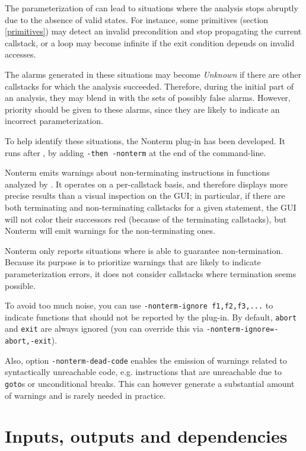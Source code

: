 \documentclass{frama-c-book}
\begin{document}
The parameterization of \Eva{} can lead to situations where the
analysis stops abruptly due to the absence of valid states. For instance,
some primitives (section \ref{primitives}) may detect an invalid
precondition and stop propagating the current callstack, or a loop may
become infinite if the exit condition depends on invalid accesses.

The alarms generated in these situations may become {\em Unknown} if
there are other callstacks for which the analysis succeeded. Therefore,
during the initial part of an analysis, they may blend in with the sets
of possibly false alarms. However, priority should be given to these
alarms, since they are likely to indicate an incorrect parameterization.

To help identify these situations, the \textsf{Nonterm} plug-in has been
developed. It runs after \Eva{}, by adding \verb|-then -nonterm|
at the end of the command-line.

\textsf{Nonterm} emits warnings about non-terminating instructions in functions
analyzed by \Eva{}. It operates on a per-callstack basis, and therefore
displays more precise results than a visual inspection on the GUI;
in particular, if there are both terminating and non-terminating callstacks for
a given statement, the GUI will not color their successors red
(because of the terminating callstacks), but \textsf{Nonterm} will emit warnings
for the non-terminating ones.

\textsf{Nonterm} only reports situations where \Eva{} is able to
guarantee non-termination. Because its purpose is to prioritize warnings
that are likely to indicate parameterization errors,
it does not consider callstacks where termination seems possible.

To avoid too much noise, you can use \verb|-nonterm-ignore f1,f2,f3,...|
to indicate functions that should not be reported by the plug-in. By default,
\verb|abort| and \verb|exit| are always ignored (you can override this via
\verb|-nonterm-ignore=-abort,-exit|).

Also, option \verb|-nonterm-dead-code| enables the emission of warnings related
to syntactically unreachable code, e.g. instructions that are unreachable due to
\verb|goto|s or unconditional breaks. This can however generate a substantial
amount of warnings and is rarely needed in practice.


\chapter{Inputs, outputs and dependencies}\label{inoutdeps}
\vspace{2cm}
\end{document}
